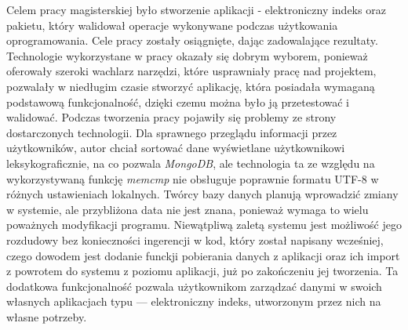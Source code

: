 \documentclass{xmgr}
\begin{document}
\summary
\indent \indent \indent Celem pracy magisterskiej było stworzenie aplikacji - elektroniczny indeks oraz pakietu, który walidował operacje wykonywane podczas użytkowania oprogramowania. Cele pracy zostały osiągnięte, dając zadowalające rezultaty.
\newline \newline
Technologie wykorzystane w pracy okazały się dobrym wyborem, ponieważ oferowały szeroki wachlarz narzędzi, które usprawniały pracę nad projektem, pozwalały w niedługim czasie stworzyć aplikację, która posiadała wymaganą podstawową funkcjonalność, dzięki czemu można było ją przetestować i walidować.
\newline \newline
Podczas tworzenia pracy pojawiły się problemy ze strony dostarczonych technologii. Dla sprawnego przeglądu informacji przez użytkowników, autor chciał sortować dane wyświetlane użytkownikowi leksykograficznie, na co pozwala \textit{MongoDB}, ale technologia ta ze względu na wykorzystywaną funkcję \textit{memcmp} nie obsługuje poprawnie formatu UTF-8 w różnych ustawieniach lokalnych. Twórcy bazy danych planują wprowadzić zmiany w systemie, ale przybliżona data nie jest znana, ponieważ wymaga to wielu poważnych modyfikacji programu.
\newline \newline
Niewątpliwą zaletą systemu jest możliwość jego rozdudowy bez konieczności ingerencji w kod, który został napisany wcześniej, czego dowodem jest dodanie funckji pobierania danych z aplikacji oraz ich import z powrotem do systemu z poziomu aplikacji, już po zakończeniu jej tworzenia. Ta dodatkowa funkcjonalność pozwala użytkownikom zarządzać danymi w swoich własnych aplikacjach typu --- elektroniczny indeks, utworzonym przez nich na własne potrzeby.







\listoffigures

\oswiadczenie
\end{document}
